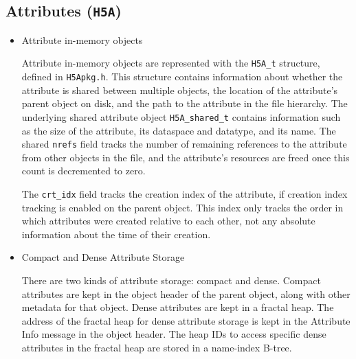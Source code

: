 \subsection{Attributes (\texttt{H5A})}



\begin{itemize}
    \item Attribute in-memory objects

Attribute in-memory objects are represented with the \texttt{H5A\_t} structure, defined in \texttt{H5Apkg.h}. This structure contains information about whether the attribute is shared between multiple objects, the location of the attribute's parent object on disk, and the path to the attribute in the file hierarchy. The underlying shared attribute object \texttt{H5A\_shared\_t} contains information such as the size of the attribute, its dataspace and datatype, and its name. The shared \texttt{nrefs} field tracks the number of remaining references to the attribute from other objects in the file, and the attribute's resources are freed once this count is decremented to zero. 

The \texttt{crt\_idx} field tracks the creation index of the attribute, if creation index tracking is enabled on the parent object. This index only tracks the order in which attributes were created relative to each other, not any absolute information about the time of their creation.

    \item Compact and Dense Attribute Storage

There are two kinds of attribute storage: compact and dense. Compact attributes are kept in the object header of the parent object, along with other metadata for that object. Dense attributes are kept in a fractal heap. The address of the fractal heap for dense attribute storage is kept in the Attribute Info message in the object header. The heap IDs to access specific dense attributes in the fractal heap are stored in a name-index B-tree. 


\end{itemize}
